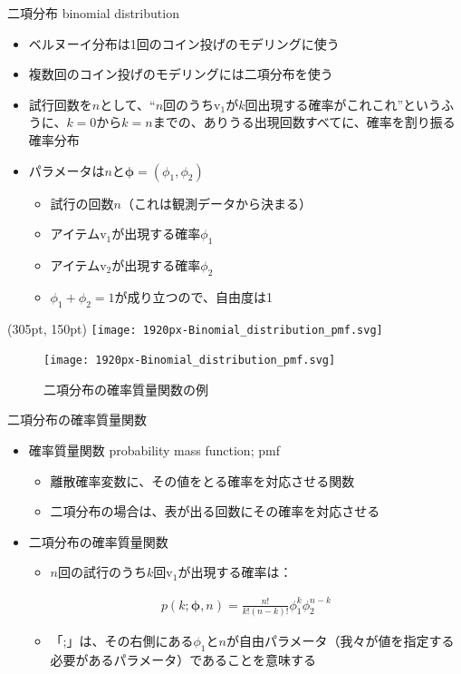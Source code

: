 \documentclass[aspectratio=169,unicode,dvipdfmx,14pt]{beamer}
\begin{document}
\begin{frame}{二項分布 binomial distribution}
\begin{itemize}
\item ベルヌーイ分布は1回のコイン投げのモデリングに使う
\item 複数回のコイン投げのモデリングには二項分布を使う
\item 試行回数を$n$として、``$n$回のうち$\mbox{v}_1$が$k$回出現する確率がこれこれ''というふうに、$k=0$から$k=n$までの、ありうる出現回数すべてに、確率を割り振る確率分布
\item パラメータは$n$と$\bm{\phi} = (\phi_1, \phi_2)$
\begin{itemize}
\item 試行の回数$n$（これは観測データから決まる）
\item アイテム$\mbox{v}_1$が出現する確率$\phi_1$
\item アイテム$\mbox{v}_2$が出現する確率$\phi_2$
\item $\phi_1 + \phi_2=1$が成り立つので、自由度は1
\end{itemize}
\end{itemize}
\begin{textblock*}{0.4\linewidth}(305pt, 150pt)
    \centering
    \texttt{[image: 1920px-Binomial\_distribution\_pmf.svg]}
\end{textblock*}
\end{frame}

\begin{frame}
\begin{figure}[htbp]
\begin{center}
\vspace{.2in}
\texttt{[image: 1920px-Binomial\_distribution\_pmf.svg]}
\caption{二項分布の確率質量関数の例}
\label{}
\end{center}
\end{figure}
\end{frame}

\begin{frame}{二項分布の確率質量関数}
\begin{itemize}
\item 確率質量関数 probability mass function; pmf
\begin{itemize}
\item 離散確率変数に、その値をとる確率を対応させる関数
\item 二項分布の場合は、表が出る回数にその確率を対応させる
\end{itemize}
\item 二項分布の確率質量関数
\begin{itemize}
\item $n$回の試行のうち$k$回$\mbox{v}_1$が出現する確率は：
\end{itemize}
\begin{align}
p(k;\bm{\phi},n)=\frac{n!}{k!(n-k)!}\phi_1^k\phi_2^{n-k}
\end{align}
\begin{itemize}
\item 「;」は、その右側にある$\phi_1$と$n$が自由パラメータ（我々が値を指定する必要があるパラメータ）であることを意味する
\end{itemize}
\end{itemize}
\end{frame}
\end{document}

